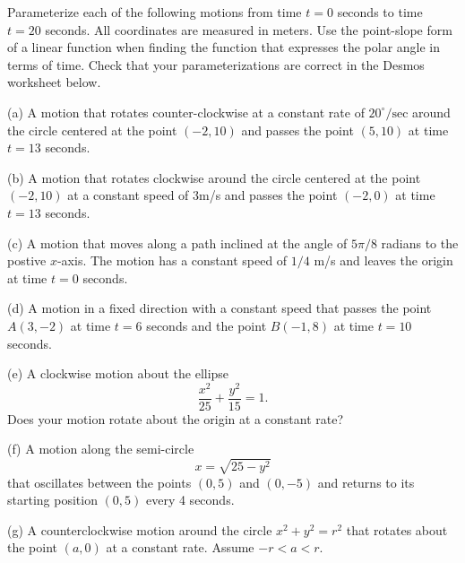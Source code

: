 \documentclass{ximera}
\begin{document}
\begin{question}  \label{Q12:Cosine}
Parameterize each of the following motions from time $t=0$ seconds to time $t=20$ seconds.  All coordinates are measured in meters. Use the point-slope form of a linear function when finding the function that expresses the polar angle in terms of time. Check that your parameterizations are correct in the Desmos worksheet  below. 

(a) A motion that rotates counter-clockwise at a constant rate of $20^\circ/\text{sec}$ around the circle centered at the point $(-2,10)$ and passes the point $(5,10)$ at time $t=13$ seconds. 

(b) A motion that rotates clockwise around the circle centered at the point $(-2,10)$ at a constant speed of $3$m/s  and passes the point $(-2,0)$ at time $t=13$ seconds. 

(c) A motion that moves along a path inclined at the angle of $5\pi/8$ radians to the postive $x$-axis. The motion has a constant speed of $1/4$ m/s and leaves the origin at time $t=0$ seconds.

(d) A motion in a fixed direction with a constant speed that passes the point $A(3,-2)$ at time $t=6$ seconds and the point $B(-1,8)$ at time $t=10$ seconds.

(e) A clockwise motion about the ellipse
\[
   \frac{x^2}{25} + \frac{y^2}{15} = 1 .
\]
Does your motion rotate about the origin at a constant rate?

(f) A motion along the semi-circle
\[
    x = \sqrt{25 - y^2}
\]
that oscillates between the points $(0,5)$ and $(0,-5)$ and returns to its starting position $(0,5)$ every 4 seconds.

(g) A counterclockwise motion around the circle $x^2+y^2=r^2$ that rotates about the point $(a,0)$ at a constant rate. Assume $-r<a<r$.

 
\begin{onlineOnly}
    \begin{center}
\end{center}
\end{onlineOnly}

\end{question}
\end{document}
